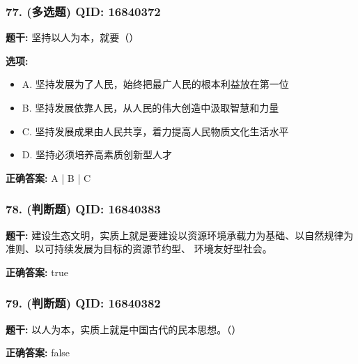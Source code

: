 \documentclass[12pt,UTF8]{ctexart}
\begin{document}
\vspace{0.3em}\hrulefill\vspace{0.7em}

\subsubsection*{77. (多选题) \small QID: 16840372}

\textbf{题干:}
坚持以人为本，就要（）

\textbf{选项:}
\begin{itemize}[leftmargin=*]

  \item A. 坚持发展为了人民，始终把最广人民的根本利益放在第一位

  \item B. 坚持发展依靠人民，从人民的伟大创造中汲取智慧和力量

  \item C. 坚持发展成果由人民共享，着力提高人民物质文化生活水平

  \item D. 坚持必须培养高素质创新型人才

\end{itemize}

\textbf{正确答案:}
A | B | C

\vspace{0.3em}\hrulefill\vspace{0.7em}

\subsubsection*{78. (判断题) \small QID: 16840383}

\textbf{题干:}
建设生态文明，实质上就是要建设以资源环境承载力为基础、以自然规律为准则、以可持续发展为目标的资源节约型、 环境友好型社会。

\textbf{正确答案:}
true

\vspace{0.3em}\hrulefill\vspace{0.7em}

\subsubsection*{79. (判断题) \small QID: 16840382}

\textbf{题干:}
以人为本，实质上就是中国古代的民本思想。（）

\textbf{正确答案:}
false

\vspace{0.3em}\hrulefill\vspace{0.7em}
\end{document}
